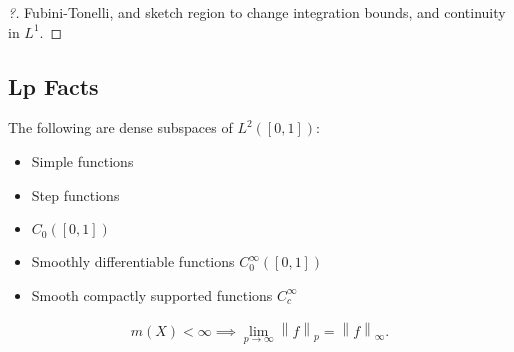 \begin{proof}[?]

Fubini-Tonelli, and sketch region to change integration bounds, and
continuity in \(L^1\).

\end{proof}

\hypertarget{lp-facts}{%
\subsection{Lp Facts}\label{lp-facts}}

\begin{proposition}

The following are dense subspaces of \(L^2([0, 1])\):

\begin{itemize}
\tightlist
\item
  Simple functions
\item
  Step functions
\item
  \(C_0([0, 1])\)
\item
  Smoothly differentiable functions \(C_0^\infty([0, 1])\)
\item
  Smooth compactly supported functions \(C_c^\infty\)
\end{itemize}

\end{proposition}

\begin{theorem}[?]

\begin{align*}
m(X) < \infty \implies \lim_{p\to\infty} {\left\lVert {f} \right\rVert}_p = {\left\lVert {f} \right\rVert}_\infty 
.\end{align*}

\end{theorem}

